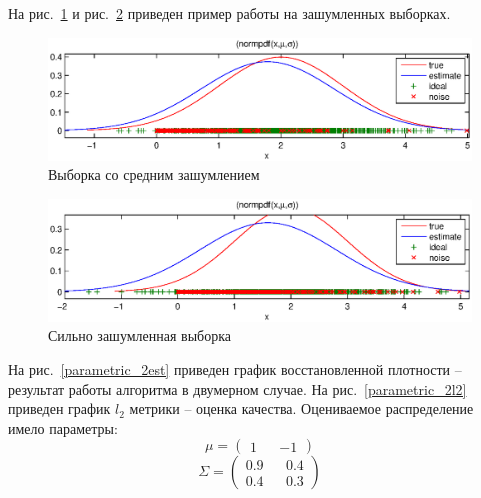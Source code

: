 \documentclass[10pt, a4paper]{article}
\begin{document}
На рис.~\ref{middle_noised_nle} и рис.~\ref{heavy_noised_nle} приведен пример работы на зашумленных выборках.
\begin{figure}[h]
    \includegraphics[width=\textwidth]{middle_noised_nle.eps}
    \caption{Выборка со средним зашумлением}
    \label{middle_noised_nle}
\end{figure}
\begin{figure}[h]
    \includegraphics[width=\textwidth]{heavy_noised_nle.eps}
    \caption{Сильно зашумленная выборка}
    \label{heavy_noised_nle}
\end{figure}

На рис.~\ref{parametric_2est} приведен график восстановленной плотности -- результат работы алгоритма в двумерном случае.
На рис.~\ref{parametric_2l2} приведен график $l_2$ метрики -- оценка качества.
Оцениваемое распределение имело параметры:
\begin{equation}
\mu=\left(\begin{matrix}
    1 && -1
\end{matrix}\right)
\label{mu}
\end{equation}
\begin{equation}
\Sigma=\left(\begin{matrix}
    0.9 && 0.4 \\
    0.4 && 0.3
\end{matrix}\right)
\label{sigma}
\end{equation}
\end{document}
